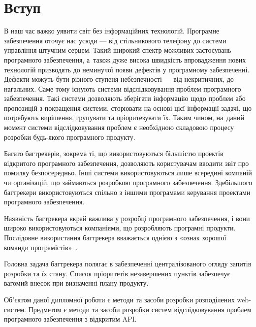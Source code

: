 \documentclass[../main.tex]{subfiles}
\begin{document}
\chapter*{Вступ}

В наш час важко уявити світ без інформаційних технологій. Програмне забезпечення оточує нас усюди — від стільникового телефону до системи управління штучним серцем. Такий широкий спектр можливих застосувань програмного забезпечення, а~також дуже висока швидкість впровадження нових технологій призводять до неминучої появи дефектів у програмному забезпеченні. Дефекти можуть бути різного ступеня небезпечності — від некритичних, до нагальних. Саме тому існують системи відслідковування проблем програмного забезпечення. Такі системи дозволяють зберігати інформацію щодо проблем або пропозицій з покращення системи, сторювати на основі цієї інформації задачі, що потребують вирішення, групувати та пріоритезувати їх. Таким чином, на~даний момент системи відслідковування проблем є необхідною складовою процесу розробки будь-якого програмного продукту.

Багато багтрекерів, зокрема ті, що використовуються більшістю проектів відкритого програмного забезпечення, дозволяють користувачам вводити звіт про помилку безпосередньо. Інші системи використовуються лише всередині компаній чи організацій, що займаються розробкою програмного забезпечення. Здебільшого багтрекери використовуються спільно з іншими програмами керування проектами програмного забезпечення.

Наявність багтрекера вкрай важлива у розробці програмного забезпечення, і вони широко використовуються компаніями, що розробляють програмні продукти. Послідовне використання багтрекера вважається однією з «ознак хорошої команди програмістів»~\cite{painless_bug_tracking}.

Головна задача багтрекера полягає в забезпеченні централізованого огляду запитів розробки та їх стану. Список пріоритетів незавершених пунктів забезпечує вагомий внесок при визначенні плану продукту.

Об'єктом даної дипломної роботи є методи та засоби розробки розподілених web-систем. Предметом є методи та засоби розробки систем відслідковування проблем програмного забезпечення з відкритим API.
\end{document}
